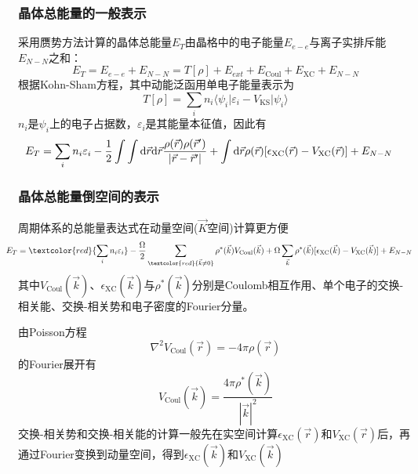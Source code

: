 \frame
{
	\frametitle{晶体总能量的一般表示}
采用赝势方法计算的晶体总能量$E_T$由晶格中的电子能量$E_{e-e}$与离子实排斥能$E_{N-N}$之和：
	\begin{displaymath}
		E_T=E_{e-e}+E_{N-N}=T[\rho]+E_{ext}+E_{\mathrm{Coul}}+E_{\mathrm{XC}}+E_{N-N}
	\end{displaymath}
根据\textrm{Kohn-Sham}方程，其中动能泛函用单电子能量表示为
\begin{displaymath}
	T[{\rho}]=\sum_in_i\langle\psi_i|\varepsilon_i-V_{\mathrm{KS}}|\psi_i\rangle
\end{displaymath}
$n_i$是$\psi_i$上的电子占据数，$\varepsilon_i$是其能量本征值，因此有
\begin{displaymath}
	\hspace*{-12.0pt}	E_T=\sum_in_i\varepsilon_i-\dfrac12\int\int\mathrm{d}\vec r\mathrm{d}\vec r\dfrac{\rho(\vec r)\rho(\vec r^{\prime})}{|\vec r-\vec r^{\prime}|}+\int\mathrm{d}\vec r\rho(\vec r)[\epsilon_{\mathrm{XC}}(\vec r)-V_{\mathrm{XC}}(\vec r)]+E_{N-N}
\end{displaymath}
}

\frame
{
	\frametitle{晶体总能量倒空间的表示}
周期体系的总能量表达式在动量空间($\vec K$空间)计算更方便
\begin{displaymath}
	\hspace*{-15.0pt}	E_T=\textcolor{red}{\sum_in_i\varepsilon_i}-\dfrac{\Omega}2\sum_{\textcolor{red}{\vec k\neq 0}}\rho^{\ast}(\vec k)V_{\mathrm{Coul}}(\vec k)+\Omega\sum_{\vec k}\rho^{\ast}(\vec k)[\epsilon_{\mathrm{XC}}(\vec k)-V_{\mathrm{XC}}(\vec k)]+E_{N-N}
\end{displaymath}
其中$V_{\mathrm{Coul}}(\vec k)$、$\epsilon_{\mathrm{XC}}(\vec k)$与$\rho^{\ast}(\vec k)$分别是\textrm{Coulomb}相互作用、单个电子的交换-相关能、交换-相关势和电子密度的\textrm{Fourier}分量。

由\textrm{Poisson}方程
\begin{displaymath}
	\nabla^2V_{\mathrm{Coul}}(\vec r)=-4\pi\rho(\vec r)
\end{displaymath}
的\textrm{Fourier}展开有
\begin{displaymath}
	V_{\mathrm{Coul}}(\vec k)=\dfrac{4\pi\rho^{\ast}(\vec k)}{|\vec k|^2}
\end{displaymath}
交换-相关势和交换-相关能的计算一般先在实空间计算$\epsilon_{\mathrm{XC}}(\vec r)$和$V_{\mathrm{XC}}(\vec r)$后，再通过\textrm{Fourier}变换到动量空间，得到$\epsilon_{\mathrm{XC}}(\vec k)$和$V_{\mathrm{XC}}(\vec k)$
}

